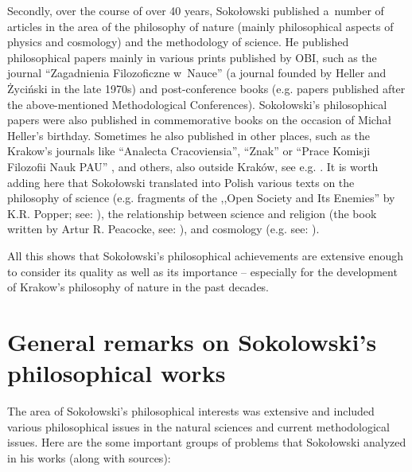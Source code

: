Secondly, over the course of over 40 years, Sokołowski published a~number of articles in the area of the philosophy of nature (mainly philosophical aspects of physics and cosmology) and the methodology of science. He published philosophical papers mainly in various prints published by OBI, such as the journal ``Zagadnienia Filozoficzne w~Nauce'' (a journal founded by Heller and Życiński in the late 1970s) and post-conference books (e.g. papers published after the above-mentioned Methodological Conferences). Sokołowski's philosophical papers were also published in commemorative books on the occasion of Michał Heller's birthday. Sometimes he also published in other places, such as the Krakow's journals like ``Analecta Cracoviensia'', ``Znak'' or ``Prace Komisji Filozofii Nauk PAU'' 
\parencite[e.g.,][]{}, %
 and others, also outside Kraków, see e.g. 
\parencites[][]{}[][]{}[][]{}. %
 It is worth adding here that Sokołowski translated into Polish various texts on the philosophy of science (e.g. fragments of the ,,Open Society and Its Enemies'' by K.R. Popper; see: 
\parencite[][]{Popper1987Hegel}%
), the relationship between science and religion (the book written by Artur R. Peacocke, see: 
\parencite[][]{Peacocke1991Teologia}%
), and cosmology (e.g. see: 
\parencite[][]{Davies1996Zasada}%
).



All this shows that Sokołowski's philosophical achievements are extensive enough to consider its quality as well as its importance -- especially for the development of Krakow's philosophy of nature in the past decades.



\section{General remarks on Sokolowski's philosophical works }

The area of Sokołowski's philosophical interests was extensive and included various philosophical issues in the natural sciences and current methodological issues. Here are the some important groups of problems that Sokołowski analyzed in his works (along with sources):



